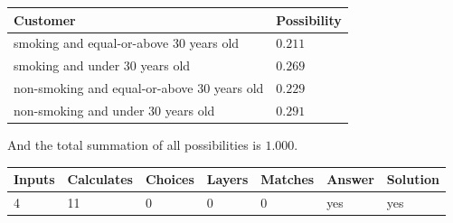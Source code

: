 \documentclass[12pt]{article}
\begin{document}
 

 
\noindent
\begin{tabular}{|l|l|}
\hline
Customer & Possibility \\
\hline
smoking  and  %
equal-or-above 30 years old &
  $ %
0.211$ \\
\hline
smoking  and  %
under 30 years old &
  $ %
0.269$ \\
\hline
 non-smoking and  %
equal-or-above 30 years old &
  $ %
0.229$ \\
\hline
 non-smoking and  %
under 30 years old &
  $ %
0.291$ \\
\hline
\end{tabular}
 
\noindent
 And the total summation of all possibilities is $  %
1.000 $.
 
 
 
\noindent{}
 
 

 
\vspace{0.3in}
   
   
   
   
\noindent\begin{tabular}{|l|l|l|l|l|l|l|}
 \hline
Inputs & Calculates & Choices & Layers & Matches & Answer & Solution \\ \hline
           4  & 
          11  & 
           0
  & 
           0  & 
           0  & 
  yes & 
  yes 
  \\ \hline
 \end{tabular}
   
   
   
   
\noindent{}
   
   
  
\end{document}
